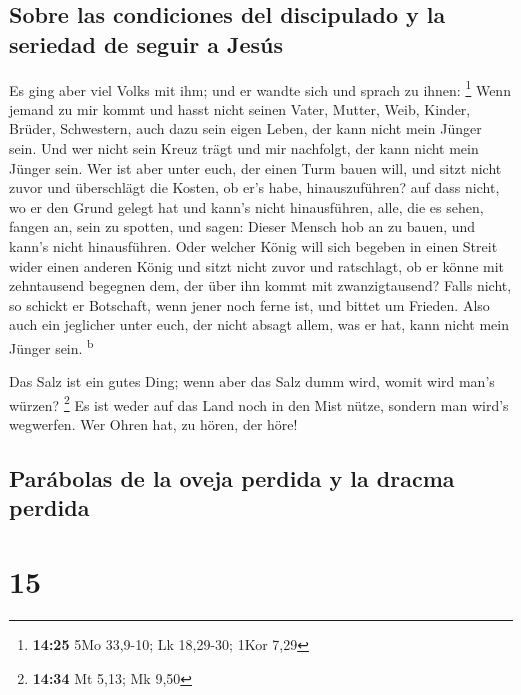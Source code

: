 \hypertarget{sobre-las-condiciones-del-discipulado-y-la-seriedad-de-seguir-a-jesuxfas}{%
\subsection{Sobre las condiciones del discipulado y la seriedad de
seguir a
Jesús}\label{sobre-las-condiciones-del-discipulado-y-la-seriedad-de-seguir-a-jesuxfas}}

 Es ging aber viel Volks mit ihm; und er wandte sich und
sprach zu ihnen: \footnote{\textbf{14:25} 5Mo 33,9-10; Lk 18,29-30; 1Kor
  7,29}  Wenn jemand zu mir kommt und hasst nicht seinen
Vater, Mutter, Weib, Kinder, Brüder, Schwestern, auch dazu sein eigen
Leben, der kann nicht mein Jünger sein.  Und wer nicht
sein Kreuz trägt und mir nachfolgt, der kann nicht mein Jünger sein.
 Wer ist aber unter euch, der einen Turm bauen will, und
sitzt nicht zuvor und überschlägt die Kosten, ob er's habe,
hinauszuführen?  auf dass nicht, wo er den Grund gelegt
hat und kann's nicht hinausführen, alle, die es sehen, fangen an, sein
zu spotten,  und sagen: Dieser Mensch hob an zu bauen,
und kann's nicht hinausführen.  Oder welcher König will
sich begeben in einen Streit wider einen anderen König und sitzt nicht
zuvor und ratschlagt, ob er könne mit zehntausend begegnen dem, der über
ihn kommt mit zwanzigtausend?  Falls nicht, so schickt er
Botschaft, wenn jener noch ferne ist, und bittet um Frieden.
 Also auch ein jeglicher unter euch, der nicht absagt
allem, was er hat, kann nicht mein Jünger sein. \textsuperscript{b}

 Das Salz ist ein gutes Ding; wenn aber das Salz dumm
wird, womit wird man's würzen? \footnote{\textbf{14:34} Mt 5,13; Mk 9,50}
 Es ist weder auf das Land noch in den Mist nütze,
sondern man wird's wegwerfen. Wer Ohren hat, zu hören, der höre!

\hypertarget{paruxe1bolas-de-la-oveja-perdida-y-la-dracma-perdida}{%
\subsection{Parábolas de la oveja perdida y la dracma
perdida}\label{paruxe1bolas-de-la-oveja-perdida-y-la-dracma-perdida}}

\hypertarget{section-14}{%
\section{15}\label{section-14}}

